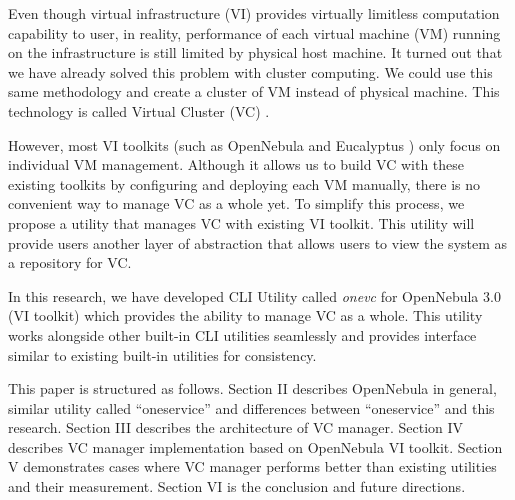 \documentclass[conference]{IEEEtran}
\begin{document}
Even though virtual infrastructure (VI) provides virtually limitless computation capability to user, in reality, performance of each virtual machine (VM) running on the infrastructure is still limited by physical host machine.
It turned out that we have already solved this problem with cluster computing.
We could use this same methodology and create a cluster of VM instead of physical machine.
This technology is called Virtual Cluster (VC) \cite{1630864}.

However, most VI toolkits (such as OpenNebula \cite{10.1109/MIC.2009.119} and Eucalyptus \cite{nurmi2009eucalyptus}) only focus on individual VM management.
Although it allows us to build VC with these existing toolkits by configuring and deploying each VM manually, there is no convenient way to manage VC as a whole yet.
To simplify this process, we propose a utility that manages VC with existing VI toolkit.
This utility will provide users another layer of abstraction that allows users to view the system as a repository for VC.

In this research, we have developed CLI Utility called \emph{onevc} for OpenNebula 3.0 (VI toolkit) which provides the ability to manage VC as a whole.
This utility works alongside other built-in CLI utilities seamlessly and provides interface similar to existing built-in utilities for consistency.

This paper is structured as follows.
Section II describes OpenNebula in general, similar utility called ``oneservice'' and differences between ``oneservice'' and this research.
Section III describes the architecture of VC manager.
Section IV describes VC manager implementation based on OpenNebula VI toolkit.
Section V demonstrates cases where VC manager performs better than existing utilities and their measurement.
Section VI is the conclusion and future directions.



%
%
\end{document}
